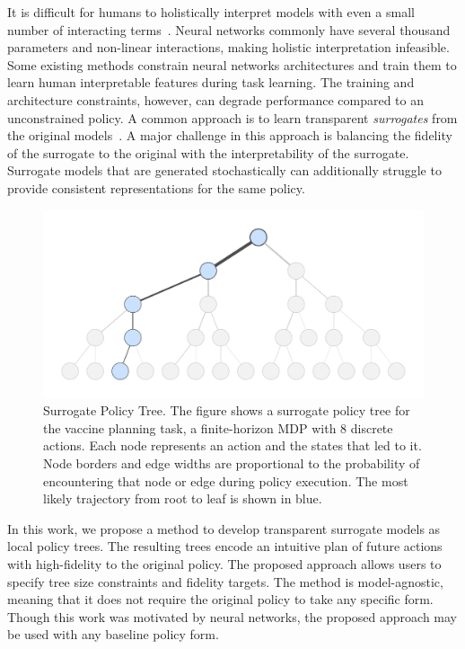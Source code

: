 \documentclass[letterpaper]{article} %
\begin{document}
It is difficult for humans to holistically interpret models with even a small number of interacting terms~\cite{lipton2018}.
Neural networks commonly have several thousand parameters and non-linear interactions, making holistic interpretation infeasible.
Some existing methods constrain neural networks architectures and train them to learn human interpretable features during task learning. %
The training and architecture constraints, however, can degrade performance compared to an unconstrained policy.
A common approach is to learn transparent \emph{surrogates} from the original models~\cite{adadi2018}.
A major challenge in this approach is balancing the fidelity of the surrogate to the original with the interpretability of the surrogate.
Surrogate models that are generated stochastically can additionally struggle to provide consistent representations for the same policy.

\begin{figure}[t]
\centering
\includegraphics[width=0.99\columnwidth]{figs/vaccine_graph_nodesonly.pdf}
\caption{Surrogate Policy Tree. The figure shows a surrogate policy tree for the vaccine planning task, a finite-horizon MDP with 8 discrete actions. Each node represents an action and the states that led to it. Node borders and edge widths are proportional to the probability of encountering that node or edge during policy execution. The most likely trajectory from root to leaf is shown in blue.}
\label{fig: graph unlabeled}
\end{figure}

In this work, we propose a method to develop transparent surrogate models as local policy trees.
The resulting trees encode an intuitive plan of future actions with high-fidelity to the original policy.
The proposed approach allows users to specify tree size constraints and fidelity targets.
The method is model-agnostic, meaning that it does not require the original policy to take any specific form.
Though this work was motivated by neural networks, the proposed approach may be used
with any baseline policy form.
\end{document}
